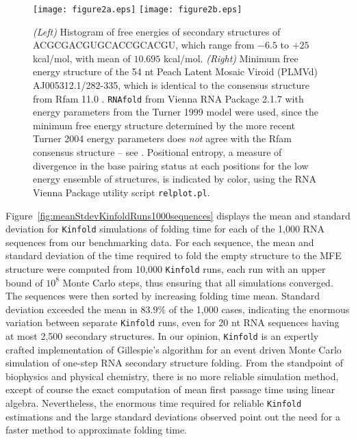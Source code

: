 \begin{figure*} [!h]
\begin{center}
\texttt{[image: figure2a.eps]}
\texttt{[image: figure2b.eps]}
\caption{\small
{\em (Left)} Histogram of free energies of secondary structures of
ACGCGACGUGCACCGCACGU, which range from $-6.5$ to $+25$ kcal/mol, with
mean of $10.695$ kcal/mol.
{\em (Right)} Minimum free energy structure of the 54 nt Peach Latent Mosaic
Viroid (PLMVd) AJ005312.1/282-335, which is identical to the consensus
structure from Rfam 11.0 \cite{Gardner.nar11}. {\tt RNAfold} from
Vienna RNA Package 2.1.7 with energy parameters from the Turner 1999
model were used, since the minimum free energy structure determined by
the more recent Turner 2004 energy parameters
does {\em not} agree with the Rfam consensus structure -- see
\cite{syntheticHammerheads}. Positional entropy, a measure
of divergence in the base pairing status at each positions for the
low energy ensemble of structures, is indicated by color, using the
RNA Vienna Package utility script {\tt relplot.pl}.
}
\label{fig:PLMVd}
\end{center}
\end{figure*}


Figure~\ref{fig:meanStdevKinfoldRuns1000sequences} displays the mean
and standard deviation for {\tt Kinfold} simulations of folding time
for each of the 1,000 RNA sequences from our benchmarking data. For
each sequence, the mean and standard deviation of the time required to
fold the empty structure to the MFE structure were computed from
10,000 {\tt Kinfold} runs, each run with an upper bound of $10^8$
Monte Carlo steps, thus ensuring that all simulations converged. The
sequences were then sorted by increasing folding time mean. Standard
deviation exceeded the mean in $83.9\%$ of the 1,000 cases, indicating
the enormous variation between separate {\tt Kinfold} runs, even for
20 nt RNA sequences having at most 2,500 secondary structures. In our
opinion, {\tt Kinfold} is an expertly crafted implementation of
Gillespie's algorithm for an event driven Monte Carlo simulation of
one-step RNA secondary structure folding. From the standpoint of
biophysics and physical chemistry, there is no more reliable
simulation method, except of course the exact computation of mean
first passage time using linear algebra. Nevertheless, the enormous
time required for reliable {\tt Kinfold} estimations and the large
standard deviations observed point out the need for a faster method to
approximate folding time.


